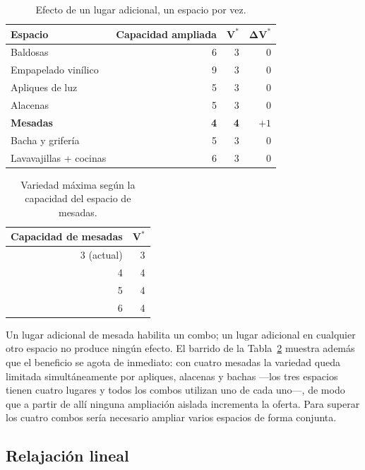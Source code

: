 \documentclass[10pt,a4paper]{article}
\newcommand{\cuello}[1]{\textbf{\textcolor{limita}{#1}}}
\begin{document}
\begin{table}[H]
\centering\small
\caption{Efecto de un lugar adicional, un espacio por vez.}
\label{tab:cap_e1}
\begin{tabular}{lrrr}
\toprule
\textbf{Espacio} & \textbf{Capacidad ampliada} & $\boldsymbol{V^{*}}$ & $\boldsymbol{\Delta V^{*}}$ \\
\midrule
Baldosas               & 6 & 3 & 0 \\
Empapelado vinílico    & 9 & 3 & 0 \\
Apliques de luz        & 5 & 3 & 0 \\
Alacenas               & 5 & 3 & 0 \\
\cuello{Mesadas}       & \cuello{4} & \cuello{4} & \cuello{$+1$} \\
Bacha y grifería       & 5 & 3 & 0 \\
Lavavajillas + cocinas & 6 & 3 & 0 \\
\bottomrule
\end{tabular}
\end{table}

\begin{table}[H]
\centering\small
\caption{Variedad máxima según la capacidad del espacio de mesadas.}
\label{tab:barrido_e1}
\begin{tabular}{rr}
\toprule
\textbf{Capacidad de mesadas} & $\boldsymbol{V^{*}}$ \\
\midrule
3 (actual) & 3 \\
4          & 4 \\
5          & 4 \\
6          & 4 \\
\bottomrule
\end{tabular}
\end{table}

Un lugar adicional de mesada habilita un combo; un lugar adicional en cualquier
otro espacio no produce ningún efecto. El barrido de la
Tabla~\ref{tab:barrido_e1} muestra además que el beneficio se agota de
inmediato: con cuatro mesadas la variedad queda limitada simultáneamente por
apliques, alacenas y bachas —los tres espacios tienen cuatro lugares y todos los
combos utilizan uno de cada uno—, de modo que a partir de allí ninguna
ampliación aislada incrementa la oferta. Para superar los cuatro combos sería
necesario ampliar varios espacios de forma conjunta.

\subsection{Relajación lineal}
\label{sec:esc1_relaj}
\end{document}
